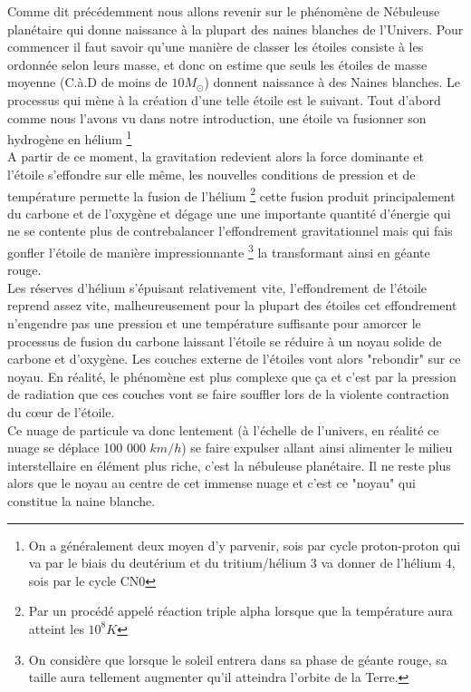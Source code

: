 \documentclass[11pt]{book} %
\begin{document}
Comme dit précédemment nous allons revenir sur le phénomène de Nébuleuse planétaire qui donne naissance à la plupart des naines blanches de l'Univers.\n
Pour commencer il faut savoir qu'une manière de classer les étoiles consiste à les ordonnée selon leurs masse, et donc on estime que seuls les étoiles de masse moyenne (C.à.D de moins de $10M_{\odot}$) donnent naissance à des Naines blanches. Le processus qui mène à la création d'une telle étoile est le suivant.\n
Tout d'abord comme nous l'avons vu dans notre introduction, une étoile va fusionner son hydrogène en hélium \footnote{On a généralement deux moyen d'y parvenir, sois par cycle proton-proton qui va par le biais du deutérium et du tritium/hélium 3 va donner de l'hélium 4, sois par le cycle CN0}\\
A partir de ce moment, la gravitation redevient alors la force dominante et l'étoile s’effondre sur elle même, les nouvelles conditions de pression et de température permette la fusion de l’hélium \footnote{Par un procédé appelé réaction triple alpha lorsque que la température aura atteint les $10^8 K$} cette fusion produit principalement du carbone et de l'oxygène et dégage une une importante quantité d'énergie qui ne se contente plus de contrebalancer l'effondrement gravitationnel mais qui fais gonfler l'étoile de manière impressionnante \footnote{On considère que lorsque le soleil entrera dans sa phase de géante rouge, sa taille aura tellement augmenter qu'il atteindra l'orbite de la Terre.} la transformant ainsi en géante rouge.\\
Les réserves d'hélium s’épuisant relativement vite, l’effondrement de l'étoile reprend assez vite, malheureusement pour la plupart des étoiles cet effondrement n'engendre pas une pression et une température suffisante pour amorcer le processus de fusion du carbone laissant l'étoile se réduire à un noyau solide de carbone et d'oxygène. Les couches externe de l'étoiles vont alors "rebondir" sur ce noyau. En réalité, le phénomène est plus complexe que ça et c'est par la pression de radiation que ces couches vont se faire souffler lors de la violente contraction du cœur de l'étoile.\\
Ce nuage de particule va donc lentement (à l'échelle de l'univers, en réalité ce nuage se déplace 100 000 $km/h$) se faire expulser allant ainsi alimenter le milieu interstellaire en élément plus riche, c'est la nébuleuse planétaire. Il ne reste plus alors que le noyau au centre de cet immense nuage et c'est ce "noyau" qui constitue la naine blanche.
\end{document}
